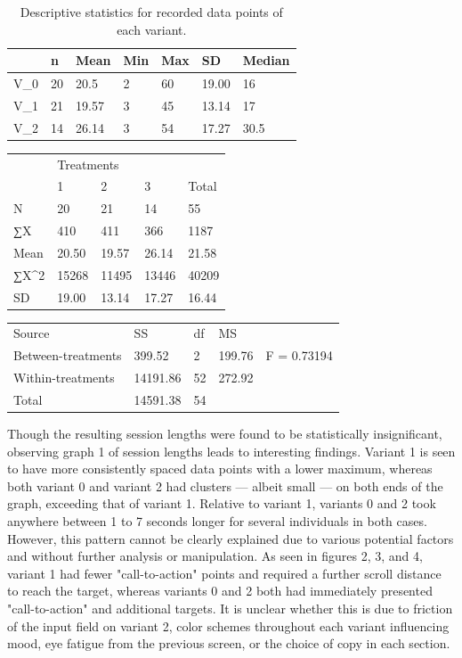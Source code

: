 \documentclass[conference]{IEEEtran}
\begin{document}
\begin{table}[]
\caption{Descriptive statistics for recorded data points of each variant.}
\label{tab:my-table}
\begin{tabular}{@{}lllllll@{}}
\toprule
   & n & Mean & Min & Max & SD  & Median \\ \midrule
V_0 & 20 & 20.5 & 2  & 60 & 19.00 & 16   \\
V_1 & 21 & 19.57 & 3  & 45 & 13.14 & 17  \\
V_2 & 14 & 26.14 & 3  & 54 & 17.27 & 30.5  \\ \bottomrule
\end{tabular}
\end{table}

\begin{table}[]
\begin{tabular}{@{}lllll@{}}
           & \multicolumn{3}{l}{Treatments} &    \\
           & 1    & 2    & 3    & Total \\
N           & 20    & 21    & 14    & 55  \\
∑X          & 410   & 411   & 366   & 1187 \\
Mean         & 20.50  & 19.57  & 26.14  & 21.58 \\
∑X\textasciicircum{}2 & 15268  & 11495  & 13446  & 40209 \\
SD          & 19.00  & 13.14  & 17.27  & 16.44
\end{tabular}
\end{table}


\begin{table}[]
\begin{tabular}{@{}lllll@{}}
Source       & SS    & df & MS   &       \\
Between-treatments & 399.52  & 2 & 199.76 & F = 0.73194 \\
Within-treatments & 14191.86 & 52 & 272.92 &       \\
Total       & 14591.38 & 54 &    &      
\end{tabular}
\end{table}

Though the resulting session lengths were found to be statistically insignificant, observing graph 1 of session lengths leads to interesting findings. Variant 1 is seen to have more consistently spaced data points with a lower maximum, whereas both variant 0 and variant 2 had clusters — albeit small — on both ends of the graph, exceeding that of variant 1. Relative to variant 1, variants 0 and 2 took anywhere between 1 to 7 seconds longer for several individuals in both cases.
However, this pattern cannot be clearly explained due to various potential factors and without further analysis or manipulation. As seen in figures 2, 3, and 4, variant 1 had fewer "call-to-action" points and required a further scroll distance to reach the target, whereas variants 0 and 2 both had immediately presented "call-to-action" and additional targets. It is unclear whether this is due to friction of the input field on variant 2, color schemes throughout each variant influencing mood, eye fatigue from the previous screen, or the choice of copy in each section.
\end{document}
